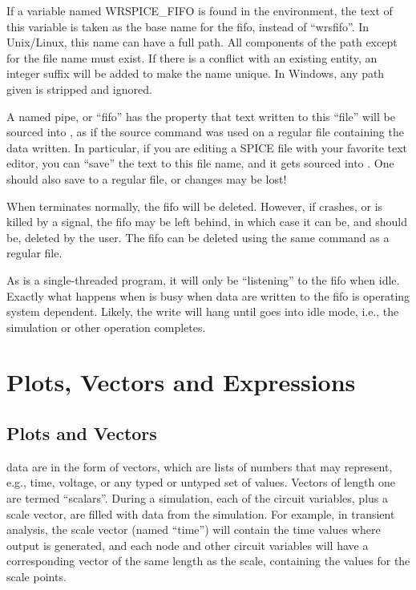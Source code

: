 If a variable named {\et WRSPICE\_FIFO} is found in the environment,
the text of this variable is taken as the base name for the fifo,
instead of ``{\vt wrsfifo}''.  In Unix/Linux, this name can have a
full path.  All components of the path except for the file name must
exist.  If there is a conflict with an existing entity, an integer
suffix will be added to make the name unique.  In Windows, any path
given is stripped and ignored.

A named pipe, or ``fifo'' has the property that text written to this
``file'' will be sourced into {\WRspice}, as if the {\cb source}
command was used on a regular file containing the data written.  In
particular, if you are editing a SPICE file with your favorite text
editor, you can ``save'' the text to this file name, and it gets
sourced into {\WRspice}.  One should also save to a regular file, or
changes may be lost!

When {\WRspice} terminates normally, the fifo will be deleted. 
However, if {\WRspice} crashes, or is killed by a signal, the fifo may
be left behind, in which case it can be, and should be, deleted by the
user.  The fifo can be deleted using the same command as a regular
file.

As {\WRspice} is a single-threaded program, it will only be
``listening'' to the fifo when idle.  Exactly what happens when
{\WRspice} is busy when data are written to the fifo is operating
system dependent.  Likely, the write will hang until {\WRspice} goes
into idle mode, i.e., the simulation or other operation completes.


\section{Plots, Vectors and Expressions}
\label{vectors}


\subsection{Plots and Vectors}

{\WRspice} data are in the form of vectors, which are lists of numbers
that may represent, e.g., time, voltage, or any typed or untyped set
of values.  Vectors of length one are termed ``scalars''.  During a
simulation, each of the circuit variables, plus a scale vector, are
filled with data from the simulation.  For example, in transient
analysis, the scale vector (named ``{\vt time}'') will contain the
time values where output is generated, and each node and other circuit
variables will have a corresponding vector of the same length as the
scale, containing the values for the scale points.


